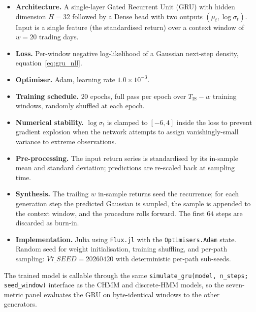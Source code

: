 \begin{itemize}
    \item \textbf{Architecture.} A single-layer Gated Recurrent Unit (GRU)
    with hidden dimension $H = 32$ followed by a Dense head with two
    outputs $(\mu_t, \log \sigma_t)$. Input is a single feature (the
    standardised return) over a context window of $w = 20$ trading days.

    \item \textbf{Loss.} Per-window negative log-likelihood of a Gaussian
    next-step density, equation~\eqref{eq:gru_nll}.

    \item \textbf{Optimiser.} Adam, learning rate $1.0 \times 10^{-3}$.

    \item \textbf{Training schedule.} $20$ epochs, full pass per epoch
    over $T_{\text{IS}} - w$ training windows, randomly shuffled at each
    epoch.

    \item \textbf{Numerical stability.} $\log \sigma_t$ is clamped to
    $[-6, 4]$ inside the loss to prevent gradient explosion when the
    network attempts to assign vanishingly-small variance to extreme
    observations.

    \item \textbf{Pre-processing.} The input return series is standardised
    by its in-sample mean and standard deviation; predictions are
    re-scaled back at sampling time.

    \item \textbf{Synthesis.} The trailing $w$ in-sample returns seed the
    recurrence; for each generation step the predicted Gaussian is
    sampled, the sample is appended to the context window, and the
    procedure rolls forward. The first $64$ steps are discarded as
    burn-in.

    \item \textbf{Implementation.} Julia using \texttt{Flux.jl}
    \cite{innes2018flux} with the \texttt{Optimisers.Adam} state.
    Random seed for weight initialisation, training shuffling, and per-path
    sampling: $V7\_SEED = 20260420$ with deterministic per-path sub-seeds.
\end{itemize}

The trained model is callable through the same
\texttt{simulate\_gru(model, n\_steps; seed\_window)} interface as the
CHMM and discrete-HMM models, so the seven-metric panel evaluates the GRU
on byte-identical windows to the other generators.

